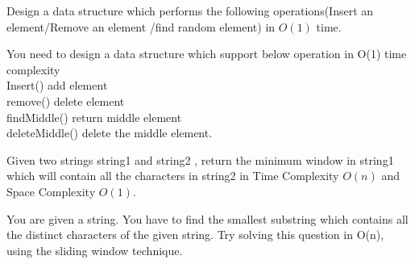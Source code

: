 {\begin{exercise}
\begin{compactenum}
\item Design a data structure which performs the following operations(Insert an element/Remove an element /find random element) in $O(1)$ time.
\item You need to design a data structure which support below operation in O(1) time complexity
    \\ Insert() add element
    \\ remove() delete element 
    \\ findMiddle()   return middle element
    \\ deleteMiddle() delete the middle element.

\item Given two strings string1 and string2 , return the minimum window in string1 which will contain all the characters in string2 in Time Complexity $O(n)$ and Space Complexity $O(1)$.
\item You are given a string. You have to find the smallest substring which contains all the distinct characters of the given string.
Try solving this question in O(n), using the sliding window technique.

\end{compactenum}


\end{exercise}}
